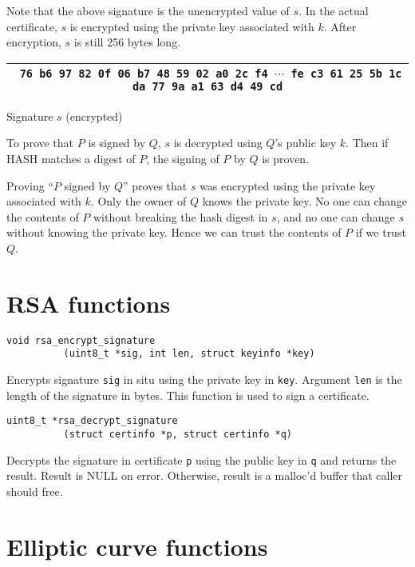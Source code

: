 \documentclass[12pt]{article}
\begin{document}
\bigskip
\noindent
Note that the above signature is the unencrypted value of $s$.
In the actual certificate, $s$ is encrypted using the private key associated with $k$.
After encryption, $s$ is still 256 bytes long.

\begin{center}
\begin{tabular}{|c|}
\hline
{\footnotesize\tt
76 b6 97 82 0f 06 b7 48 59 02 a0 2c f4 $\cdots$
fe c3 61 25 5b 1c da 77 9a a1 63 d4 49 cd}\\
\hline
\end{tabular}

\medskip
Signature $s$ (encrypted)
\end{center}

\noindent
To prove that $P$ is signed by $Q$, $s$ is decrypted using $Q$'s public key $k$.
Then if HASH matches a digest of $P$, the signing of $P$ by $Q$ is proven.

\bigskip
\noindent
Proving ``$P$ signed by $Q$'' proves that $s$ was encrypted using the private key associated with $k$.
Only the owner of $Q$ knows the private key.
No one can change the contents of $P$ without breaking the hash digest in $s$,
and no one can change $s$ without knowing the private key.
Hence we can trust the contents of $P$ if we trust $Q$.

\newpage
\section{RSA functions}

\bigskip
\bigskip
\begin{verbatim}
void rsa_encrypt_signature
          (uint8_t *sig, int len, struct keyinfo *key)
\end{verbatim}

\noindent
Encrypts signature {\tt sig} in situ using the private key in {\tt key}.
Argument {\tt len} is the length of the signature in bytes.
This function is used to sign a certificate.

\bigskip
\bigskip
\begin{verbatim}
uint8_t *rsa_decrypt_signature
          (struct certinfo *p, struct certinfo *q)
\end{verbatim}

\noindent
Decrypts the signature in certificate {\tt p} using the public key in {\tt q} and returns the result.
Result is NULL on error.
Otherwise, result is a malloc'd buffer that caller should free.

\newpage
\section{Elliptic curve functions}
\end{document}
